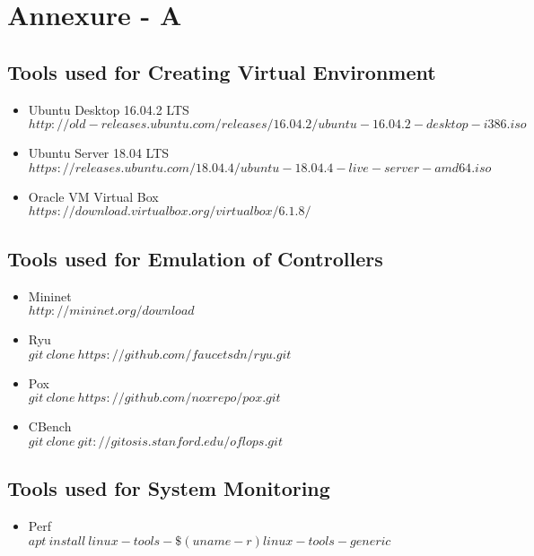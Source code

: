 \chapter*{Annexure - A}

\section*{Tools used for Creating Virtual Environment}

\begin{itemize}

    \item Ubuntu Desktop 16.04.2 LTS \\
    $http://old-releases.ubuntu.com/releases/16.04.2/ubuntu-16.04.2-desktop-i386.iso$
    \item Ubuntu Server 18.04 LTS \\
    $https://releases.ubuntu.com/18.04.4/ubuntu-18.04.4-live-server-amd64.iso$
    \item Oracle VM Virtual Box \\
    $https://download.virtualbox.org/virtualbox/6.1.8/$
    
\end{itemize}

\section*{Tools used for Emulation of Controllers}

\begin{itemize}

    \item Mininet \\
    $http://mininet.org/download$
    \item Ryu \\
    $git\ clone\ https://github.com/faucetsdn/ryu.git$
    \item Pox \\
    $git\ clone\ https://github.com/noxrepo/pox.git$
    \item CBench \\ 
    $git\ clone\ git://gitosis.stanford.edu/oflops.git$
    
\end{itemize}

\section*{Tools used for System Monitoring}

\begin{itemize}

    \item Perf \\
    $apt\ install\ linux-tools-\$(uname -r) linux-tools-generic$
\end{itemize}